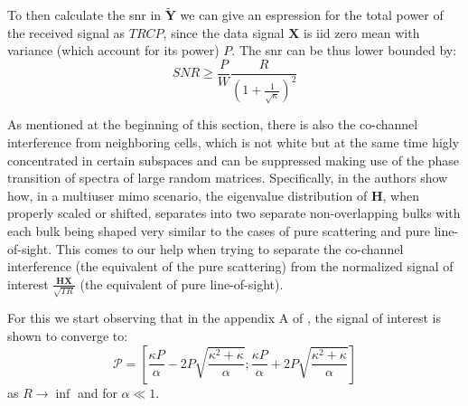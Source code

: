\documentclass[11pt]{book}
\begin{document}
To then calculate the \gls{snr} in $\mathbf{\tilde{Y}}$ we can give an espression for the total power of the received signal as $TRCP$, since the data signal $\mathbf{X}$ is iid zero mean with variance (which account for its power) $P$. The \gls{snr} can be thus lower bounded by:
\begin{equation}
  SNR \geq \frac{P}{W}\frac{R}{\left(1+ \frac{1}{\sqrt{\kappa}}\right)^2}
\end{equation}


As mentioned at the beginning of this section, there is also the co-channel interference from neighboring cells, which is not white but at the same time higly concentrated in certain subspaces and can be suppressed making use of the phase transition of spectra of large random matrices. Specifically, in \cite{Ralf2012} the authors show how, in a multiuser \gls{mimo} scenario, the eigenvalue distribution of $\mathbf{H}$, when properly scaled or shifted, separates into two separate non-overlapping bulks with each bulk being shaped very similar to the cases of pure scattering and pure line-of-sight. This comes to our help when trying to separate the co-channel interference (the equivalent of the pure scattering) from the normalized signal of interest $\frac{\mathbf{HX}}{\sqrt{TR}}$ (the equivalent of pure line-of-sight).

For this we start observing that in the appendix A of \cite{Ralf}, the signal of interest is shown to converge to:
\begin{equation}
  \mathcal{P} = \left[\frac{\kappa P}{\alpha}-2P\sqrt{\frac{\kappa^2 + \kappa}{\alpha}};\frac{\kappa P}{\alpha} + 2P\sqrt{\frac{\kappa^2 + \kappa}{\alpha}}\right]
\end{equation}
as $R \rightarrow \inf$ and for $\alpha \ll 1$.
\end{document}
